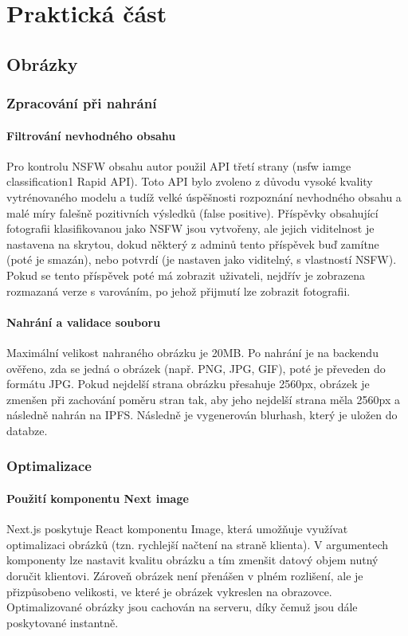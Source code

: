 \documentclass[12pt, a4paper,
 twoside,        %
 openright
]{report}
\begin{document}
\chapter{Praktická část}


\section{Obrázky}
\subsection{Zpracování při nahrání}
\subsubsection{Filtrování nevhodného obsahu}\label{section:nsfw_filter}
Pro kontrolu NSFW obsahu autor použil API třetí strany (nsfw iamge classification1 Rapid API). Toto API bylo zvoleno z důvodu vysoké kvality vytrénovaného modelu a tudíž velké úspěšnosti rozpoznání nevhodného obsahu a malé míry falešně pozitivních výsledků (false positive). Příspěvky obsahující fotografii klasifikovanou jako NSFW jsou vytvořeny, ale jejich viditelnost je nastavena na skrytou, dokud některý z adminů tento příspěvek buď zamítne (poté je smazán), nebo potvrdí (je nastaven jako viditelný, s vlastností NSFW). Pokud se tento příspěvek poté má zobrazit uživateli, nejdřív je zobrazena rozmazaná verze s varováním, po jehož přijmutí lze zobrazit fotografii.

\subsubsection{Nahrání a validace souboru} Maximální velikost nahraného obrázku je 20MB.  Po nahrání je na backendu ověřeno, zda se jedná o obrázek (např. PNG, JPG, GIF), poté je převeden do formátu JPG. Pokud nejdelší strana obrázku přesahuje 2560px, obrázek je zmenšen při zachování poměru stran tak, aby jeho nejdelší strana měla 2560px a následně nahrán na IPFS. Následně je vygenerován blurhash, který je uložen do databze.
\subsection{Optimalizace}
\subsubsection{Použití komponentu Next image}
Next.js poskytuje React komponentu Image, která umožňuje využívat optimalizaci obrázků (tzn. rychlejší načtení na straně klienta). V argumentech komponenty lze nastavit kvalitu obrázku a tím zmenšit datový objem nutný doručit klientovi. Zároveň obrázek není přenášen v plném rozlišení, ale je přizpůsobeno velikosti, ve které je obrázek vykreslen na obrazovce. Optimalizované obrázky jsou cachován na serveru, díky čemuž jsou dále poskytované instantně. \cite{nextImage}
\end{document}
